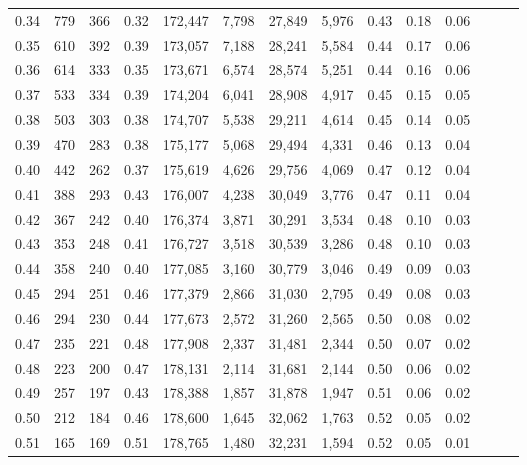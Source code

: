 \begin{tabular}{rrrrrrrrrrrrrr}
0.34 &     779 &    366 &  0.32 &  172,447 &    7,798 &  27,849 &   5,976 &  0.43 &  0.18 &      0.06 \\
0.35 &     610 &    392 &  0.39 &  173,057 &    7,188 &  28,241 &   5,584 &  0.44 &  0.17 &      0.06 \\
0.36 &     614 &    333 &  0.35 &  173,671 &    6,574 &  28,574 &   5,251 &  0.44 &  0.16 &      0.06 \\
0.37 &     533 &    334 &  0.39 &  174,204 &    6,041 &  28,908 &   4,917 &  0.45 &  0.15 &      0.05 \\
0.38 &     503 &    303 &  0.38 &  174,707 &    5,538 &  29,211 &   4,614 &  0.45 &  0.14 &      0.05 \\
0.39 &     470 &    283 &  0.38 &  175,177 &    5,068 &  29,494 &   4,331 &  0.46 &  0.13 &      0.04 \\
0.40 &     442 &    262 &  0.37 &  175,619 &    4,626 &  29,756 &   4,069 &  0.47 &  0.12 &      0.04 \\
0.41 &     388 &    293 &  0.43 &  176,007 &    4,238 &  30,049 &   3,776 &  0.47 &  0.11 &      0.04 \\
0.42 &     367 &    242 &  0.40 &  176,374 &    3,871 &  30,291 &   3,534 &  0.48 &  0.10 &      0.03 \\
0.43 &     353 &    248 &  0.41 &  176,727 &    3,518 &  30,539 &   3,286 &  0.48 &  0.10 &      0.03 \\
0.44 &     358 &    240 &  0.40 &  177,085 &    3,160 &  30,779 &   3,046 &  0.49 &  0.09 &      0.03 \\
0.45 &     294 &    251 &  0.46 &  177,379 &    2,866 &  31,030 &   2,795 &  0.49 &  0.08 &      0.03 \\
0.46 &     294 &    230 &  0.44 &  177,673 &    2,572 &  31,260 &   2,565 &  0.50 &  0.08 &      0.02 \\
0.47 &     235 &    221 &  0.48 &  177,908 &    2,337 &  31,481 &   2,344 &  0.50 &  0.07 &      0.02 \\
0.48 &     223 &    200 &  0.47 &  178,131 &    2,114 &  31,681 &   2,144 &  0.50 &  0.06 &      0.02 \\
0.49 &     257 &    197 &  0.43 &  178,388 &    1,857 &  31,878 &   1,947 &  0.51 &  0.06 &      0.02 \\
0.50 &     212 &    184 &  0.46 &  178,600 &    1,645 &  32,062 &   1,763 &  0.52 &  0.05 &      0.02 \\
0.51 &     165 &    169 &  0.51 &  178,765 &    1,480 &  32,231 &   1,594 &  0.52 &  0.05 &      0.01 \\

\end{tabular}
